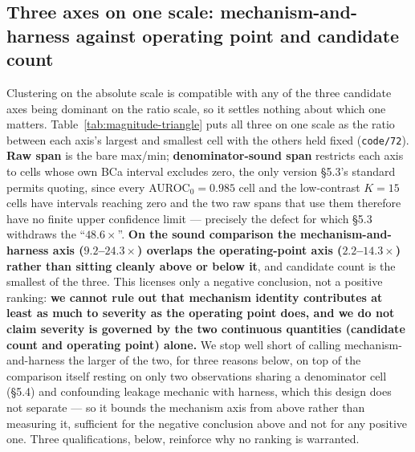 \documentclass[10pt]{article} %
\begin{document}
\subsection{Three axes on one scale: mechanism-and-harness against operating point and candidate count}
\label{sec:magnitude-triangle}

Clustering on the absolute scale is compatible with any of the three candidate
axes being dominant on the ratio scale, so it settles nothing about which one
matters. Table~\ref{tab:magnitude-triangle} puts all three on one scale as the
ratio between each axis's largest and smallest cell with the others held fixed
(\texttt{code/72}). \textbf{Raw span} is the bare max/min;
\textbf{denominator-sound span} restricts each axis to cells whose own BCa
interval excludes zero, the only version §5.3's standard permits quoting, since
every AUROC$_0=0.985$ cell and the low-contrast $K=15$ cells have intervals
reaching zero and the two raw spans that use them therefore have no finite
upper confidence limit --- precisely the defect for which §5.3 withdraws the
``$48.6\times$''. \textbf{On the sound comparison the mechanism-and-harness
axis ($9.2$--$24.3\times$) overlaps the operating-point axis
($2.2$--$14.3\times$) rather than sitting cleanly above or below it}, and
candidate count is the smallest of the three. This licenses only a negative
conclusion, not a positive ranking: \textbf{we cannot rule out that mechanism
identity contributes at least as much to severity as the operating point
does, and we do not claim severity is governed by the two continuous
quantities (candidate count and operating point) alone.} We stop well short of
calling mechanism-and-harness the larger of the two, for three reasons below,
on top of the comparison itself resting on only two observations sharing a
denominator cell (§5.4) and confounding leakage mechanic with harness, which
this design does not separate --- so it bounds the mechanism axis from above
rather than measuring it, sufficient for the negative conclusion above and not
for any positive one. Three qualifications, below, reinforce why no ranking is
warranted.
\end{document}
